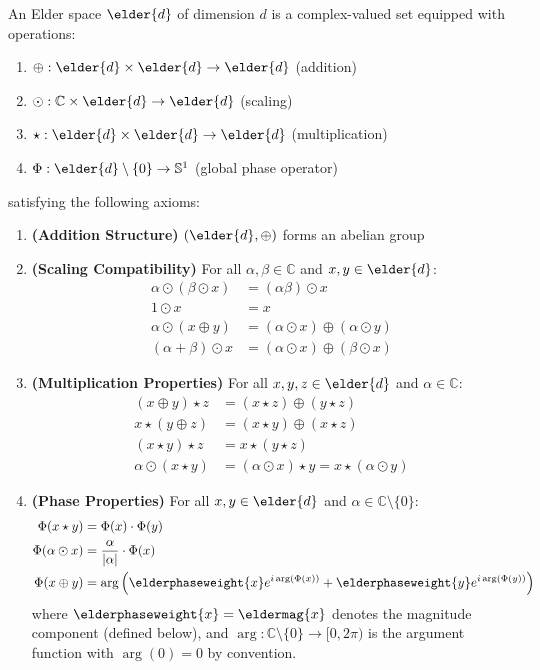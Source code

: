 \begin{definition}
\label{def:elder_space}
An Elder space $\elder{d}$ of dimension $d$ is a complex-valued set equipped with operations:
\begin{enumerate}
    \item $\oplus: \elder{d} \times \elder{d} \rightarrow \elder{d}$ (addition)
    \item $\odot: \mathbb{C} \times \elder{d} \rightarrow \elder{d}$ (scaling)
    \item $\star: \elder{d} \times \elder{d} \rightarrow \elder{d}$ (multiplication)
    \item $\Phi: \elder{d} \setminus \{0\} \rightarrow \mathbb{S}^1$ (global phase operator)
\end{enumerate}
satisfying the following axioms:
\begin{enumerate}[label=\textbf{A\arabic*}]
    \item \textbf{(Addition Structure)} $(\elder{d}, \oplus)$ forms an abelian group
    \item \textbf{(Scaling Compatibility)} For all $\alpha, \beta \in \mathbb{C}$ and $x, y \in \elder{d}$:
    \begin{align}
        \alpha \odot (\beta \odot x) &= (\alpha\beta) \odot x\\
        1 \odot x &= x\\
        \alpha \odot (x \oplus y) &= (\alpha \odot x) \oplus (\alpha \odot y)\\
        (\alpha + \beta) \odot x &= (\alpha \odot x) \oplus (\beta \odot x)
    \end{align}
    
    \item \textbf{(Multiplication Properties)} For all $x, y, z \in \elder{d}$ and $\alpha \in \mathbb{C}$:
    \begin{align}
        (x \oplus y) \star z &= (x \star z) \oplus (y \star z)\\
        x \star (y \oplus z) &= (x \star y) \oplus (x \star z)\\
        (x \star y) \star z &= x \star (y \star z)\\
        \alpha \odot (x \star y) &= (\alpha \odot x) \star y = x \star (\alpha \odot y)
    \end{align}
    
    \item \textbf{(Phase Properties)} For all $x, y \in \elder{d}$ and $\alpha \in \mathbb{C} \setminus \{0\}$:
    \begin{align}
        \Phi(x \star y) &= \Phi(x) \cdot \Phi(y)\\
        \Phi(\alpha \odot x) &= \frac{\alpha}{|\alpha|} \cdot \Phi(x)\\
        \Phi(x \oplus y) &= \arg\left(\elderphaseweight{x}e^{i\arg(\Phi(x))} + \elderphaseweight{y}e^{i\arg(\Phi(y))}\right)
    \end{align}
    where $\elderphaseweight{x} = \eldermag{x}$ denotes the magnitude component (defined below), and $\arg: \mathbb{C} \setminus \{0\} \rightarrow [0, 2\pi)$ is the argument function with $\arg(0) = 0$ by convention.
\end{enumerate}
\end{definition}

